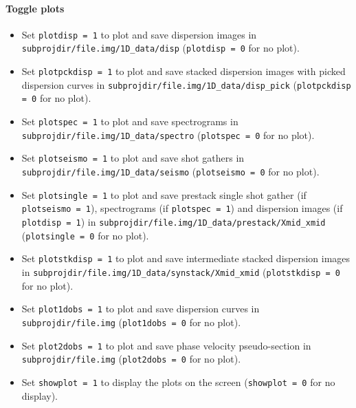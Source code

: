 \documentclass[twoside,a4paper]{article}
\begin{document}
\paragraph{Toggle plots}
\begin{itemize}[leftmargin=*]
\setlength\itemsep{2ex}
\item Set \verb|plotdisp = 1| to plot and save dispersion images in \verb|subprojdir/file.img/1D_data/disp| (\verb|plotdisp = 0| for no plot).

\item Set \verb|plotpckdisp = 1| to plot and save stacked dispersion images with picked dispersion curves in \verb|subprojdir/file.img/1D_data/disp_pick| (\verb|plotpckdisp = 0| for no plot).

\item Set \verb|plotspec = 1| to plot and save spectrograms in \verb|subprojdir/file.img/1D_data/spectro| (\verb|plotspec = 0| for no plot).

\item Set \verb|plotseismo = 1| to plot and save shot gathers in \verb|subprojdir/file.img/1D_data/seismo| (\verb|plotseismo = 0| for no plot).

\item Set \verb|plotsingle = 1| to plot and save prestack single shot gather (if \verb|plotseismo = 1|), spectrograms (if \verb|plotspec = 1|) and dispersion images (if \verb|plotdisp = 1|) in \verb|subprojdir/file.img/1D_data/prestack/Xmid_xmid| (\verb|plotsingle = 0| for no plot).

\item Set \verb|plotstkdisp = 1| to plot and save intermediate stacked dispersion images in \verb|subprojdir/file.img/1D_data/synstack/Xmid_xmid| (\verb|plotstkdisp = 0| for no plot).

\item Set \verb|plot1dobs = 1| to plot and save dispersion curves in \verb|subprojdir/file.img| (\verb|plot1dobs = 0| for no plot).

\item Set \verb|plot2dobs = 1| to plot and save phase velocity pseudo-section in \verb|subprojdir/file.img| (\verb|plot2dobs = 0| for no plot).

\item Set \verb|showplot = 1| to display the plots on the screen (\verb|showplot = 0| for no display).
\end{itemize}
\end{document}
